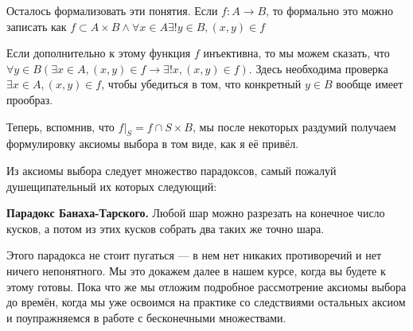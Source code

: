 Осталось формализовать эти понятия. Если $f: A\to B$, то формально это можно записать как $f\subset A\times B \wedge \forall x \in A \exists!y\in B, (x, y)\in f$

Если дополнительно к этому функция $f$ инъективна, то мы можем сказать, что $\forall y\in B (\exists x\in A, (x, y)\in f \rightarrow \exists!x, (x, y)\in f)$. Здесь необходима проверка $\exists x\in A, (x, y)\in f$, чтобы убедиться в том, что конкретный $y\in B$ вообще имеет прообраз.

Теперь, вспомнив, что $f|_S = f\cap S\times B$, мы после некоторых раздумий получаем формулировку аксиомы выбора в том виде, как я её привёл.

Из аксиомы выбора следует множество парадоксов, самый пожалуй душещипательный их которых следующий:

{\bfseries Парадокс Банаха-Тарского.} Любой шар можно разрезать на конечное число кусков, а потом из этих кусков собрать два таких же точно шара.

Этого парадокса не стоит пугаться — в нем нет никаких противоречий и нет ничего непонятного. Мы это докажем далее в нашем курсе, когда вы будете к этому готовы. Пока что же мы отложим подробное рассмотрение аксиомы выбора до времён, когда мы уже освоимся на практике со следствиями остальных аксиом и поупражняемся в работе с бесконечными множествами.
